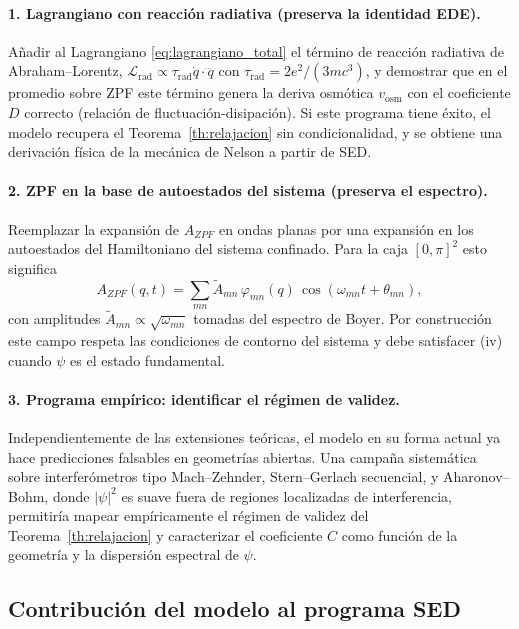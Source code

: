 \documentclass[11pt,a4paper]{article}
\begin{document}
\paragraph{1. Lagrangiano con reacción radiativa (preserva la identidad EDE).}
Añadir al Lagrangiano \eqref{eq:lagrangiano_total} el término de
reacción radiativa de Abraham--Lorentz,
$\mathcal{L}_\text{rad}\propto\tau_\text{rad}\dot q\cdot\dddot q$ con
$\tau_\text{rad}=2e^2/(3mc^3)$, y demostrar que en el promedio sobre
ZPF este término genera la deriva osmótica $v_\text{osm}$ con el
coeficiente $D$ correcto (relación de fluctuación-disipación). Si este
programa tiene éxito, el modelo recupera el Teorema~\ref{th:relajacion}
sin condicionalidad, y se obtiene una derivación física de la mecánica
de Nelson a partir de SED.

\paragraph{2. ZPF en la base de autoestados del sistema
(preserva el espectro).}
Reemplazar la expansión de $A_{ZPF}$ en ondas planas por una expansión
en los autoestados del Hamiltoniano del sistema confinado. Para la
caja $[0,\pi]^2$ esto significa
\begin{equation}
A_{ZPF}(q,t) = \sum_{mn}\tilde{A}_{mn}\,\varphi_{mn}(q)\,
\cos(\omega_{mn}t+\theta_{mn}),
\label{eq:zpf_modos_caja}
\end{equation}
con amplitudes $\tilde{A}_{mn}\propto\sqrt{\omega_{mn}}$ tomadas del
espectro de Boyer. Por construcción este campo respeta las condiciones
de contorno del sistema y debe satisfacer (iv) cuando $\psi$ es el
estado fundamental.

\paragraph{3. Programa empírico: identificar el régimen de validez.}
Independientemente de las extensiones teóricas, el modelo en su forma
actual ya hace predicciones falsables en geometrías abiertas. Una
campaña sistemática sobre interferómetros tipo Mach--Zehnder,
Stern--Gerlach secuencial, y Aharonov--Bohm, donde $|\psi|^2$ es suave
fuera de regiones localizadas de interferencia, permitiría mapear
empíricamente el régimen de validez del Teorema~\ref{th:relajacion} y
caracterizar el coeficiente $C$ como función de la geometría y la
dispersión espectral de $\psi$.

\subsection{Contribución del modelo al programa SED}
\label{sec:contribucion}
\end{document}

